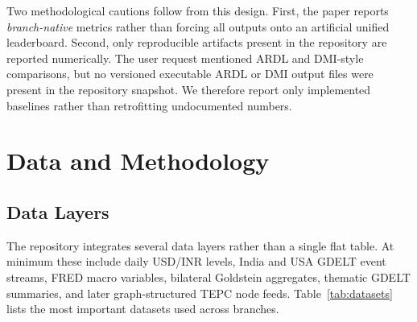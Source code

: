 \documentclass[11pt,a4paper]{article}
\begin{document}
Two methodological cautions follow from this design. First, the paper reports \textit{branch-native} metrics rather than forcing all outputs onto an artificial unified leaderboard. Second, only reproducible artifacts present in the repository are reported numerically. The user request mentioned ARDL and DMI-style comparisons, but no versioned executable ARDL or DMI output files were present in the repository snapshot. We therefore report only implemented baselines rather than retrofitting undocumented numbers.

\section{Data and Methodology}

\subsection{Data Layers}

The repository integrates several data layers rather than a single flat table. At minimum these include daily USD/INR levels, India and USA GDELT event streams, FRED macro variables, bilateral Goldstein aggregates, thematic GDELT summaries, and later graph-structured TEPC node feeds. Table~\ref{tab:datasets} lists the most important datasets used across branches.
\end{document}
